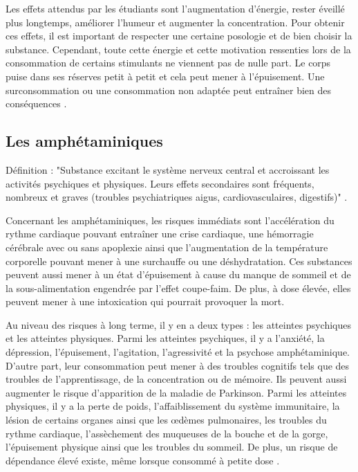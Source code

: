 Les effets attendus par les étudiants sont l'augmentation d'énergie, rester éveillé plus longtemps, améliorer l'humeur et augmenter la concentration. Pour obtenir ces effets, il est important de respecter une certaine posologie et de bien choisir la substance. Cependant, toute cette énergie et cette motivation ressenties lors de la consommation de certains stimulants ne viennent pas de nulle part. Le corps puise dans ses réserves petit à petit et cela peut mener à l'épuisement. Une surconsommation ou une consommation non adaptée peut entraîner bien des
conséquences \parencite{schifano_benefits_2022}.

\subsection{Les amphétaminiques}

Définition : "Substance excitant le système nerveux central et accroissant les activités psychiques et physiques. Leurs effets secondaires sont fréquents, nombreux et graves (troubles psychiatriques aigus, cardiovasculaires, digestifs)" \parencite{noauthor_amphetaminique_nodate}.

Concernant les amphétaminiques, les risques immédiats sont l'accélération du rythme cardiaque pouvant entraîner une crise cardiaque, une hémorragie cérébrale avec ou sans apoplexie ainsi que l'augmentation de la température corporelle pouvant mener à une surchauffe ou une déshydratation. Ces substances peuvent aussi mener à un état d'épuisement à cause du manque de sommeil et de la sous-alimentation engendrée par l'effet coupe-faim. De plus, à dose élevée, elles peuvent mener à une intoxication qui pourrait provoquer la mort. 

Au niveau des risques à long terme, il y en a deux types : les atteintes psychiques et les atteintes physiques. Parmi les atteintes psychiques, il y a l'anxiété, la dépression, l'épuisement, l'agitation, l'agressivité et la psychose amphétaminique. D'autre part, leur consommation peut mener à des troubles cognitifs tels que des troubles de l'apprentissage, de la concentration ou de mémoire. Ils peuvent aussi augmenter le risque d'apparition de la maladie de Parkinson. Parmi les atteintes physiques, il y a la perte de poids, l'affaiblissement du système immunitaire, la lésion de certains organes ainsi que les \oe dèmes pulmonaires, les troubles du rythme cardiaque, l'assèchement des muqueuses de la bouche et de la gorge, l'épuisement physique ainsi que les troubles du sommeil. De plus, un risque de dépendance élevé existe, même lorsque consommé à petite dose \parencite{koren_use_2021, lappin_psychostimulant_2019, sabbe_use_2022, noauthor_consommation_2022}.

